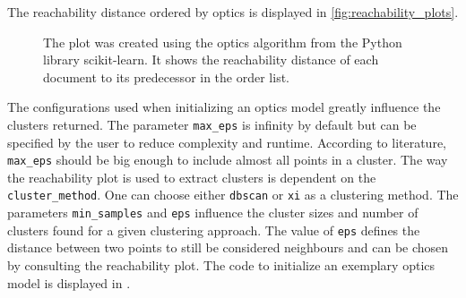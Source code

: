 The reachability distance ordered by \ac{optics} is displayed in \autoref{fig:reachability_plots}.

\begin{figure}%
    \centering
    \qquad
    \caption[Reachability distances]{The plot was created using the \ac{optics} algorithm from the Python library scikit-learn.
    It shows the reachability distance of each document to its predecessor in the order list.}%
    \label{fig:reachability_plots}%
\end{figure}

The configurations used when initializing an \ac{optics} model greatly influence the clusters returned.
The parameter \texttt{max\_eps} is infinity by default but can be specified by the user to reduce complexity and runtime.
According to literature, \texttt{max\_eps} should be big enough to include almost all points in a cluster.
The way the reachability plot is used to extract clusters is dependent on the \texttt{cluster\_method}. 
One can choose either \texttt{dbscan} or \texttt{xi} as a clustering method.
The parameters \texttt{min\_samples} and \texttt{eps} influence the cluster sizes and number of clusters found for a given clustering approach.
The value of \texttt{eps} defines the distance between two points to still be considered neighbours 
and can be chosen by consulting the reachability plot.
The code to initialize an exemplary \ac{optics} model is displayed in .

